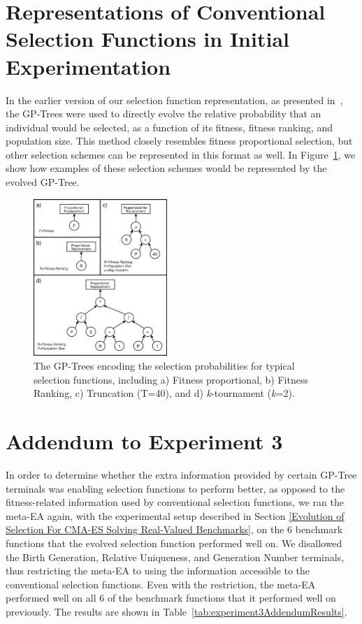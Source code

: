 \documentclass[sigconf]{acmart}
\begin{document}
\section{Representations of Conventional Selection Functions in Initial Experimentation}
\label{apx:originalEppseaRepresentation}

In the earlier version of our selection function representation, as presented in~\citep{richter2018adpsea}, the GP-Trees were used to directly evolve the relative probability that an individual would be selected, as a function of its fitness, fitness ranking, and population size. This method closely resembles fitness proportional selection, but other selection schemes can be represented in this format as well. In Figure~\ref{fig:old_eppsea_representation}, we show how examples of these selection schemes would be represented by the evolved GP-Tree.

\begin{figure}
	\centering
	\includegraphics[width=0.45\textwidth]{old_eppsea_representation}
	\caption{The GP-Trees encoding the selection probabilities for typical selection functions, including a) Fitness proportional, b) Fitness Ranking, c) Truncation (T=40), and d) \textit{k}-tournament (\textit{k}=2).}
	\label{fig:old_eppsea_representation}
\end{figure}

\section{Addendum to Experiment 3}
\label{apx:exp3addendum}

In order to determine whether the extra information provided by certain GP-Tree terminals was enabling selection functions to perform better, as opposed to the fitness-related information used by conventional selection functions, we ran the meta-EA again, with the experimental setup described in Section \ref{Evolution of Selection For CMA-ES Solving Real-Valued Benchmarks}, on the 6 benchmark functions that the evolved selection function performed well on. We disallowed the Birth Generation, Relative Uniqueness, and Generation Number terminals, thus restricting the meta-EA to using the information accessible to the conventional selection functions. Even with the restriction, the meta-EA performed well on all 6 of the benchmark functions that it performed well on previously. The results are shown in Table~\ref{tab:experiment3AddendumResults}.
\end{document}
